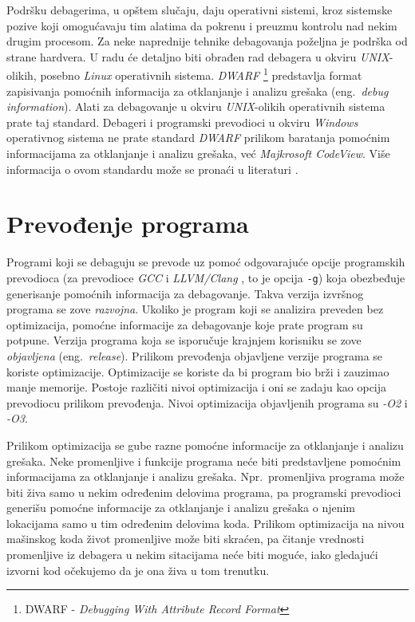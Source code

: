 \documentclass[12pt,oneside]{memoir}
\begin{document}
Podršku debagerima, u opštem slučaju, daju operativni sistemi, kroz sistemske pozive koji omogućavaju tim alatima da pokrenu i preuzmu kontrolu nad nekim drugim procesom. Za neke naprednije tehnike debagovanja poželjna je podrška od strane hardvera. U radu će detaljno biti obrađen rad debagera u okviru \emph{UNIX}-olikih, posebno \emph{Linux} operativnih sistema. \emph{DWARF} \footnote{DWARF - \emph{Debugging With Attribute Record Format}}\cite{DWARF} predstavlja format zapisivanja pomoćnih informacija za otklanjanje i analizu grešaka (eng.~\emph{debug information}). Alati za debagovanje u okviru \emph{UNIX}-olikih operativnih sistema prate taj standard. Debageri i programski prevodioci u okviru \emph{Windows} operativnog sistema ne prate standard \emph{DWARF} prilikom baratanja pomoćnim informacijama za otklanjanje i analizu grešaka, već \emph{Majkrosoft CodeView}. Više informacija o ovom standardu može se pronaći u literaturi \cite{CodeView}.

\section{Prevođenje programa}

Programi koji se debaguju se prevode uz pomoć odgovarajuće opcije programskih prevodioca (za prevodioce \emph{GCC} \cite{GCC} i \emph{LLVM/Clang} \cite{LLVM}, to je opcija \texttt{-g}) koja obezbeđuje generisanje pomoćnih informacija za debagovanje. Takva verzija izvršnog programa se zove \emph{razvojna}. Ukoliko je program koji se analizira preveden bez optimizacija, pomoćne informacije za debagovanje koje prate program su potpune. Verzija programa koja se isporučuje krajnjem korisniku se zove \emph{objavljena} (eng.~\emph{release}). Prilikom prevođenja objavljene verzije programa se koriste optimizacije. Optimizacije se koriste da bi program bio brži i zauzimao manje memorije. Postoje različiti nivoi optimizacija i oni se zadaju kao opcija prevodiocu prilikom prevođenja. Nivoi optimizacija objavljenih programa su \emph{-O2} i \emph{-O3}.

Prilikom optimizacija se gube razne pomoćne informacije za otklanjanje i analizu grešaka. Neke promenljive i funkcije programa neće biti predstavljene pomoćnim informacijama za otklanjanje i analizu grešaka. Npr.~promenljiva programa može biti živa samo u nekim određenim delovima programa, pa programski prevodioci generišu pomoćne informacije za otklanjanje i analizu grešaka o njenim lokacijama samo u tim određenim delovima koda. Prilikom optimizacija na nivou mašinskog koda život promenljive može biti skraćen, pa čitanje vrednosti promenljive iz debagera u nekim sitacijama neće biti moguće, iako gledajući izvorni kod očekujemo da je ona živa u tom trenutku.
\end{document}
